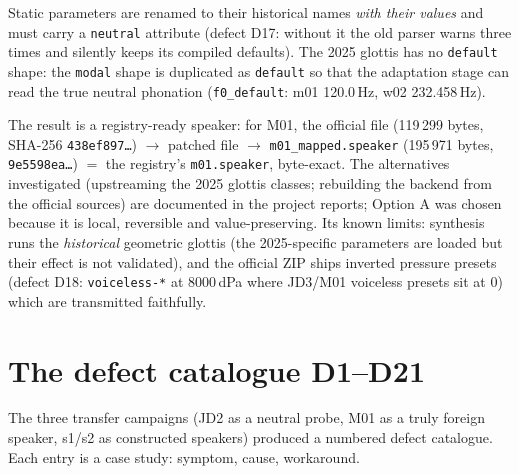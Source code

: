 \documentclass[11pt,a4paper]{article}
\newcommand{\code}[1]{\texttt{#1}}
\begin{document}
Static parameters are renamed to their historical names \emph{with
their values} and must carry a \code{neutral} attribute (defect D17:
without it the old parser warns three times and silently keeps its
compiled defaults). The 2025 glottis has no \code{default} shape: the
\code{modal} shape is duplicated as \code{default} so that the
adaptation stage can read the true neutral phonation
(\texttt{f0\_default}: m01 120.0\,Hz, w02 232.458\,Hz).

The result is a registry-ready speaker: for M01, the official file
(119\,299 bytes, SHA-256 \code{438ef897\ldots}) $\to$ patched file
$\to$ \code{m01\_mapped.speaker} (195\,971 bytes,
\code{9e5598ea\ldots}) $=$ the registry's \code{m01.speaker},
byte-exact. The alternatives investigated (upstreaming the 2025
glottis classes; rebuilding the backend from the official sources)
are documented in the project reports; Option A was chosen because it
is local, reversible and value-preserving. Its known limits:
synthesis runs the \emph{historical} geometric glottis (the
2025-specific parameters are loaded but their effect is not
validated), and the official ZIP ships inverted pressure presets
(defect D18: \code{voiceless-*} at 8000\,dPa where JD3/M01 voiceless
presets sit at 0) which are transmitted faithfully.

\section{The defect catalogue D1--D21}\label{sec:defects}

The three transfer campaigns (JD2 as a neutral probe, M01 as a truly
foreign speaker, s1/s2 as constructed speakers) produced a numbered
defect catalogue. Each entry is a case study: symptom, cause,
workaround.
\end{document}
